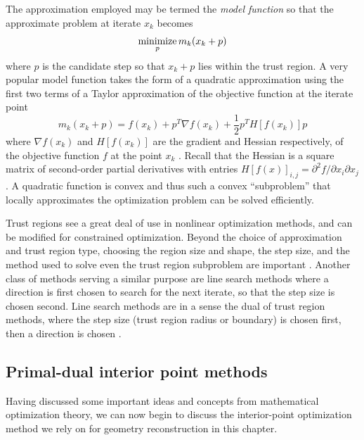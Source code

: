 The approximation employed may be termed the \emph{model function} so that the approximate problem at iterate $x_k$ becomes
\begin{equation}
\operatornamewithlimits{minimize}_p m_k(x_k + p)
\end{equation}
where $p$ is the candidate step so that $x_k + p$ lies within the trust region. A very popular model function takes the form of a quadratic approximation using the first two terms of a Taylor approximation of the objective function at the iterate point
\begin{equation}
  m_k(x_k + p) = f(x_k) + p^T \nabla f(x_k) + \frac{1}{2} p^T H[f(x_k)] p
\end{equation}
where $\nabla f(x_k)$ and $H[f(x_k)]$ are the gradient and Hessian respectively, of the objective function $f$ at the point $x_k$ \citep{More83}. Recall that the Hessian is a square matrix of second-order partial derivatives with entries $H[f(x)]_{i,j} = \partial^2 f/\partial x_i \partial x_j$. A quadratic function is convex and thus such a convex ``subproblem'' that locally approximates the optimization problem can be solved efficiently.

Trust regions see a great deal of use in nonlinear optimization methods, and can be modified for constrained optimization. Beyond the choice of approximation and trust region type, choosing the region size and shape, the step size, and the method used to solve even the trust region subproblem are important \citep[ch. 4]{Nocedal06}. Another class of methods serving a similar purpose are line search methods where a direction is first chosen to search for the next iterate, so that the step size is chosen second. Line search methods are in a sense the dual of trust region methods, where the step size (trust region radius or boundary) is chosen first, then a direction is chosen \citep[ch. 1]{Nocedal06}.

\subsection{Primal-dual interior point methods} \label{ssec:interiorPoint}
Having discussed some important ideas and concepts from mathematical optimization theory, we can now begin to discuss the interior-point optimization method we rely on for geometry reconstruction in this chapter.

